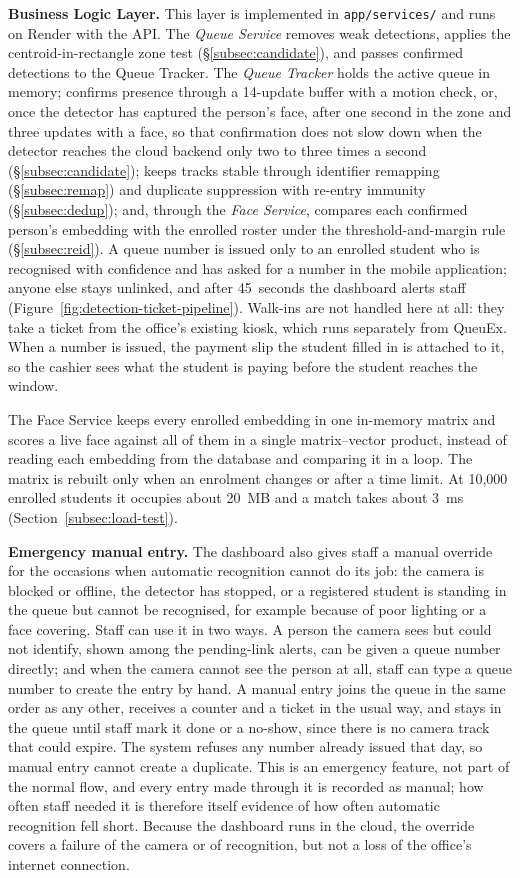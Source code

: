 \documentclass{research}
\newcommand{\sysname}{QueuEx}
\begin{document}
\textbf{Business Logic Layer.} This layer is implemented in
\texttt{app/services/} and runs on Render with the API. The \emph{Queue
Service} removes weak detections, applies the centroid-in-rectangle zone
test (\S\ref{subsec:candidate}), and passes confirmed detections to the
Queue Tracker. The \emph{Queue Tracker} holds the active queue in memory;
confirms presence through a 14-update buffer with a motion check, or,
once the detector has captured the person's face, after one second in
the zone and three updates with a face, so that confirmation does not
slow down when the detector reaches the cloud backend only two to three
times a second (\S\ref{subsec:candidate}); keeps tracks stable through identifier
remapping (\S\ref{subsec:remap}) and duplicate suppression with re-entry
immunity (\S\ref{subsec:dedup}); and, through the \emph{Face Service},
compares each confirmed person's embedding with the enrolled roster under
the threshold-and-margin rule (\S\ref{subsec:reid}). A queue number is
issued only to an enrolled student who is recognised with confidence
and has asked for a number in the mobile application; anyone else stays
unlinked, and after 45~seconds the dashboard alerts staff
(Figure~\ref{fig:detection-ticket-pipeline}). Walk-ins are not handled
here at all: they take a ticket from the office's existing kiosk, which
runs separately from \sysname{}. When a number is issued, the payment
slip the student filled in is attached to it, so the cashier sees what
the student is paying before the student reaches the window.

The Face Service keeps every enrolled embedding in one in-memory matrix
and scores a live face against all of them in a single matrix--vector
product, instead of reading each embedding from the database and
comparing it in a loop. The matrix is rebuilt only when an enrolment
changes or after a time limit. At 10,000 enrolled students it occupies
about 20~MB and a match takes about 3~ms
(Section~\ref{subsec:load-test}).

\textbf{Emergency manual entry.} The dashboard also gives staff a manual
override for the occasions when automatic recognition cannot do its job:
the camera is blocked or offline, the detector has stopped, or a
registered student is standing in the queue but cannot be recognised,
for example because of poor lighting or a face covering. Staff can use
it in two ways. A person the camera sees but could not identify, shown
among the pending-link alerts, can be given a queue number directly; and
when the camera cannot see the person at all, staff can type a queue
number to create the entry by hand. A manual entry joins the queue in the
same order as any other, receives a counter and a ticket in the usual
way, and stays in the queue until staff mark it done or a no-show, since
there is no camera track that could expire. The system refuses any
number already issued that day, so manual entry cannot create a
duplicate. This is an emergency feature, not part of the normal flow, and
every entry made through it is recorded as manual; how often staff
needed it is therefore itself evidence of how often automatic
recognition fell short. Because the dashboard runs in the cloud, the
override covers a failure of the camera or of recognition, but not a loss
of the office's internet connection.
\end{document}
